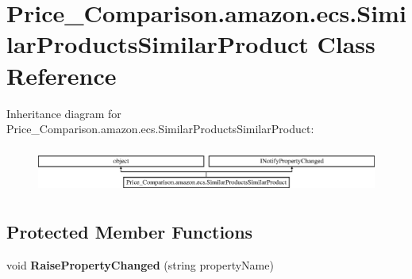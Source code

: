 \hypertarget{class_price___comparison_1_1amazon_1_1ecs_1_1_similar_products_similar_product}{\section{Price\-\_\-\-Comparison.\-amazon.\-ecs.\-Similar\-Products\-Similar\-Product Class Reference}
\label{class_price___comparison_1_1amazon_1_1ecs_1_1_similar_products_similar_product}
}


 


Inheritance diagram for Price\-\_\-\-Comparison.\-amazon.\-ecs.\-Similar\-Products\-Similar\-Product\-:\begin{figure}[H]
\begin{center}
\leavevmode
\includegraphics[height=1.517615cm]{class_price___comparison_1_1amazon_1_1ecs_1_1_similar_products_similar_product}
\end{center}
\end{figure}
\subsection*{Protected Member Functions}
\begin{DoxyCompactItemize}
\item 
\hypertarget{class_price___comparison_1_1amazon_1_1ecs_1_1_similar_products_similar_product_a41ca2fea3f10a8efe5a745c66d863793}{void {\bfseries Raise\-Property\-Changed} (string property\-Name)}\label{class_price___comparison_1_1amazon_1_1ecs_1_1_similar_products_similar_product_a41ca2fea3f10a8efe5a745c66d863793}

\end{DoxyCompactItemize}
